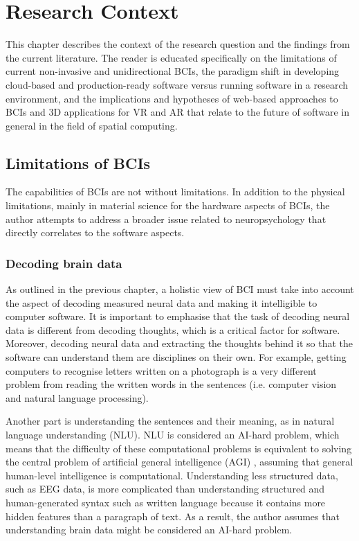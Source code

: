 \chapter{Research Context}
\graphicspath{{Chapter2/Figs/}{Chapter2/Figs/}}

This chapter describes the context of the research question and the findings from the current literature. The reader is educated specifically on the limitations of current non-invasive and unidirectional BCIs, the paradigm shift in developing cloud-based and production-ready software versus running software in a research environment, and the implications and hypotheses of web-based approaches to BCIs and 3D applications for VR and AR that relate to the future of software in general in the field of spatial computing.

\section{Limitations of BCIs}
\label{chapter2-limitations-of-bcis}

The capabilities of BCIs are not without limitations. In addition to the physical limitations, mainly in material science for the hardware aspects of BCIs, the author attempts to address a broader issue related to neuropsychology that directly correlates to the software aspects.

\subsection{Decoding brain data}
\label{chapter2-decoding-brain-data}

As outlined in the previous chapter, a holistic view of BCI must take into account the aspect of decoding measured neural data and making it intelligible to computer software. It is important to emphasise that the task of decoding neural data is different from decoding thoughts, which is a critical factor for software. Moreover, decoding neural data and extracting the thoughts behind it so that the software can understand them are disciplines on their own. For example, getting computers to recognise letters written on a photograph is a very different problem from reading the written words in the sentences (i.e. computer vision and natural language processing).

Another part is understanding the sentences and their meaning, as in natural language understanding (NLU). NLU is considered an AI-hard problem, which means that the difficulty of these computational problems is equivalent to solving the central problem of artificial general intelligence (AGI) \citep{demasi_theoretical_2010}, assuming that general human-level intelligence is computational. Understanding less structured data, such as EEG data, is more complicated than understanding structured and human-generated syntax such as written language because it contains more hidden features than a paragraph of text. As a result, the author assumes that understanding brain data might be considered an AI-hard problem.

